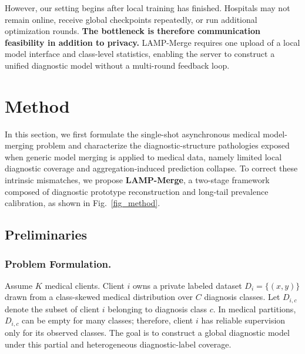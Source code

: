 \documentclass[letterpaper]{article} %
\begin{document}
However, our setting begins after local training has finished. Hospitals may not remain online, receive global checkpoints repeatedly, or run additional optimization rounds. \textbf{The bottleneck is therefore communication feasibility in addition to privacy.} LAMP-Merge requires one upload of a local model interface and class-level statistics, enabling the server to construct a unified diagnostic model without a multi-round feedback loop.

\section{Method}

In this section, we first formulate the single-shot asynchronous medical model-merging problem and characterize the diagnostic-structure pathologies exposed when generic model merging is applied to medical data, namely limited local diagnostic coverage and aggregation-induced prediction collapse. To correct these intrinsic mismatches, we propose \textbf{LAMP-Merge}, a two-stage framework composed of diagnostic prototype reconstruction and long-tail prevalence calibration, as shown in Fig.~\ref{fig_method}.

\subsection{Preliminaries}

\subsubsection{Problem Formulation.}

Assume $K$ medical clients. Client $i$ owns a private labeled dataset $D_i=\{(x,y)\}$ drawn from a class-skewed medical distribution over $C$ diagnosis classes. Let $D_{i,c}$ denote the subset of client $i$ belonging to diagnosis class $c$. In medical partitions, $D_{i,c}$ can be empty for many classes; therefore, client $i$ has reliable supervision only for its observed classes. The goal is to construct a global diagnostic model under this partial and heterogeneous diagnostic-label coverage.
\end{document}
